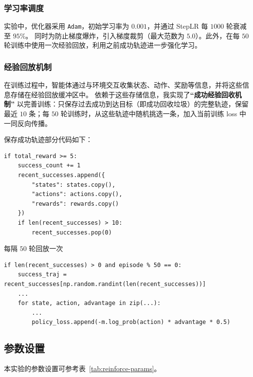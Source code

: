 \subsubsection{学习率调度}

实验中，优化器采用 \texttt{Adam}，初始学习率为 \(0.001\)，并通过 StepLR 每 \(1000\) 轮衰减至 \(95\)\%。
同时为防止梯度爆炸，引入梯度裁剪（最大范数为 \(5.0\)）。此外，在每 \(50\) 轮训练中使用一次经验回放，利用之前成功轨迹进一步强化学习。

\subsubsection{经验回放机制}

在训练过程中，智能体通过与环境交互收集状态、动作、奖励等信息，并将这些信息存储在经验回放缓冲区中。
依赖于这些存储信息，我实现了\textbf{“成功经验回收机制”} 以完善训练：只保存过去成功到达目标（即成功回收垃圾）的完整轨迹，保留最近 \(10\) 条；每 \(50\) 轮训练时，从这些轨迹中随机挑选一条，加入当前训练 loss 中一同反向传播。


保存成功轨迹部分代码如下：

\begin{verbatim}
if total_reward >= 5:
    success_count += 1
    recent_successes.append({
        "states": states.copy(),
        "actions": actions.copy(),
        "rewards": rewards.copy()
    })
    if len(recent_successes) > 10:
        recent_successes.pop(0)
\end{verbatim}

每隔 \(50\) 轮回放一次

\begin{verbatim}
if len(recent_successes) > 0 and episode % 50 == 0:
    success_traj = recent_successes[np.random.randint(len(recent_successes))]
    ...
    for state, action, advantage in zip(...):
        ...
        policy_loss.append(-m.log_prob(action) * advantage * 0.5)
\end{verbatim}

\subsection{参数设置}

本实验的参数设置可参考表~\ref{tab:reinforce-params}。

